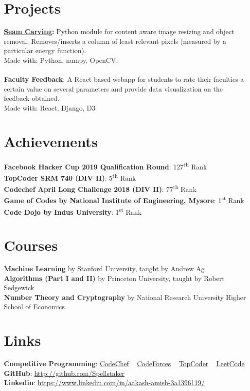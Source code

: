 \documentclass[margin, centered]{res}
\begin{document}
\begin{resume}
		\section{Projects}
			\textbf{\href{https://github.com/Spellstaker/Seam-Carving}{Seam Carving}:}
			Python module for content aware image resizing and object removal.
			Removes/inserts a column of least relevant pixels (measured by a particular energy function).\\
			Made with: Python, numpy, OpenCV.
			\\ \\
			\textbf{Faculty Feedback}:
			A React based webapp for students to rate their faculties a certain value on several parameters
			and provide data visualization on the feedback obtained.\\
			Made with: React, Django, D3
		
		\section{Achievements}
			\textbf{Facebook Hacker Cup 2019 Qualification Round}: 127\textsuperscript{th} Rank\\
			\textbf{TopCoder SRM 740 (DIV II)}: 5\textsuperscript{th} Rank\\
			\textbf{Codechef April Long Challenge 2018 (DIV II)}: 77\textsuperscript{th} Rank\\
			\textbf{Game of Codes by National Institute of Engineering, Mysore}: 1\textsuperscript{st} Rank\\
			\textbf{Code Dojo by Indus University}: 1\textsuperscript{st} Rank
		
		\section{Courses}
			\textbf{Machine Learning} by Stanford University, taught by Andrew Ag\\
			\textbf{Algorithms (Part I and II)} by Princeton University, taught by Robert Sedgewick\\
			\textbf{Number Theory and Cryptography} by National Research University Higher School of Economics 
		
		\section{Links}
			\textbf{Competitive Programming}:
			\href{https://www.codechef.com/users/spellstaker}{CodeChef}
			~
			\href{https://codeforces.com/profile/spellstaker}{CodeForces}
			~
			\href{https://topcoder.com/members/spellstaker/}{TopCoder}
			~
			\href{https://leetcode.com/spellstaker/}{LeetCode}
			\\
			\textbf{GitHub}: \href{https://github.com/Spellstaker}{http://github.com/Spellstaker}
			\\
			\textbf{Linkedin}: \href{https://www.linkedin.com/in/aakash-amish-3a1396119/}{https://www.linkedin.com/in/aakash-amish-3a1396119/}
	\end{resume}
\end{document}
